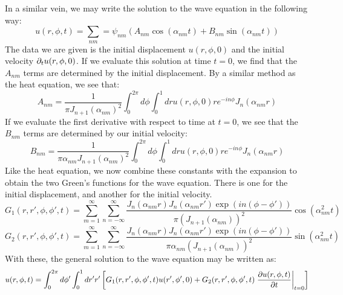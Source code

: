 \documentclass{article}
\begin{document}
In a similar vein, we may write the solution to the wave equation in the following way:
\begin{equation}
u(r,\phi,t) = \sum_{nm} = \psi_{nm}(A_{nm}\cos(\alpha_{nm} t)+B_{nm}\sin(\alpha_{nm}t))
\end{equation}
The data we are given is the initial displacement $u(r,\phi,0)$ and the initial velocity $\partial_{t} u(r,\phi,0)$. If we evaluate this solution at time $t=0$, we find that the $A_{nm}$ terms are determined by the initial displacement. By a similar method as the heat equation, we see that:
\begin{equation}
  A_{nm} = \frac{1}{\pi J_{n+1}(\alpha_{nm})^2}\int_0^{2\pi} d\phi\int_0^1 dr u(r,\phi,0) r e^{- i n \phi}J_n(\alpha_{nm} r)
\end{equation}
If we evaluate the first derivative with respect to time at $t=0$, we see that the $B_{nm}$ terms are determined by our initial velocity:
\begin{equation}
  B_{nm} = \frac{1}{\pi\alpha_{nm} J_{n+1}(\alpha_{nm})^2}\int_0^{2\pi} d\phi\int_0^1 dr u(r,\phi,0) r e^{- i n \phi}J_n(\alpha_{nm} r)
\end{equation}
Like the heat equation, we now combine these constants with the expansion to obtain the two Green's functions for the wave equation. There is one for the initial displacement, and another for the initial velocity.
\begin{equation}
  \boxed{
    \boxed{
      G_1(r,r',\phi,\phi',t) = \sum_{m = 1}^\infty \sum_{n = -\infty} ^\infty 
      \frac{J_n(\alpha_{nm} r) J_n(\alpha_{nm} r') \exp\left(i n(\phi - \phi')\right) }{\pi \left(J_{n+1}(\alpha_{nm})\right)^2}\cos\left(\alpha_{nm}^2 t\right)
    }
  }
\end{equation}
\begin{equation}
  \boxed{
    \boxed{
      G_2(r,r',\phi,\phi',t) = \sum_{m = 1}^\infty \sum_{n = -\infty} ^\infty 
      \frac{J_n(\alpha_{nm} r) J_n(\alpha_{nm} r') \exp\left(i n(\phi - \phi')\right) }{\pi \alpha_{nm}\left(J_{n+1}(\alpha_{nm})\right)^2}\sin\left(\alpha_{nm}^2 t\right)
    }
  }
\end{equation}
With these, the general solution to the wave equation may be written as:
\begin{equation}
  u(r,\phi,t) = \int_0^{2\pi} d\phi' \int_0^1 dr' r' \left[G_1(r,r',\phi,\phi',t) u(r',\phi',0)+ G_2(r,r',\phi,\phi',t) \left.\frac{\partial u(r,\phi,t)}{\partial t}\right|_{t=0}\right]
\end{equation}
\end{document}
